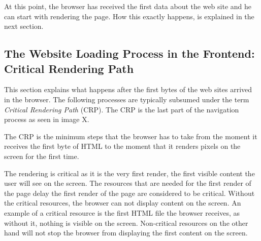 
At this point, the browser has received the first data about the web site and he can start with rendering the page.
How this exactly happens, is explained in the next section.







\subsection{The Website Loading Process in the Frontend: Critical Rendering Path}

This section explains what happens after the first bytes of the web sites arrived in the browser.
The following processes are typically subsumed under the term \textit{Critical Rendering Path} (CRP).
The CRP is the last part of the navigation process as seen in image X.



The CRP is the minimum steps that the browser has to take from the moment it receives the first byte of HTML to the moment that it renders pixels on the screen for the first time.

The rendering is critical as it is the very first render, the first visible content the user will see on the screen.
The resources that are needed for the first render of the page delay the first render of the page are considered to be critical.
Without the critical resources, the browser can not display content on the screen.
An example of a critical resource is the first HTML file the browser receives, as without it, nothing is visible on the screen.
Non-critical resources on the other hand will not stop the browser from displaying the first content on the screen. %







